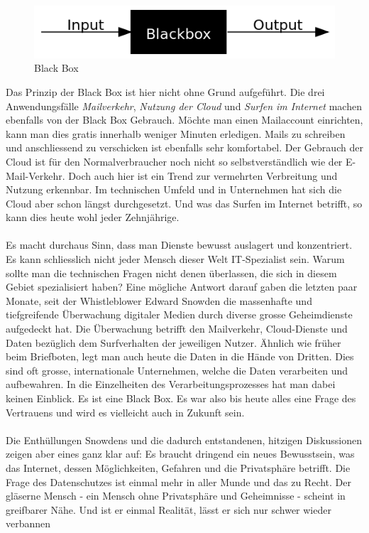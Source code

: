 \begin{figure}[h]
\centering
\includegraphics[scale=0.75]{images/BlackBox}
\caption{Black Box}
\end{figure}

Das Prinzip der Black Box ist hier nicht ohne Grund aufgeführt. Die drei Anwendungsfälle \textit{Mailverkehr}, \textit{Nutzung der Cloud} und \textit{Surfen im Internet} machen ebenfalls von der Black Box Gebrauch. Möchte man einen Mailaccount einrichten, kann man dies gratis innerhalb weniger Minuten erledigen. Mails zu schreiben und anschliessend zu verschicken ist ebenfalls sehr komfortabel. Der Gebrauch der Cloud ist für den Normalverbraucher noch nicht so selbstverständlich wie der E-Mail-Verkehr. Doch auch hier ist ein Trend zur vermehrten Verbreitung und Nutzung erkennbar. Im technischen Umfeld und in Unternehmen hat sich die Cloud aber schon längst durchgesetzt. Und was das Surfen im Internet betrifft, so kann dies heute wohl jeder Zehnjährige.
\\
\\
Es macht durchaus Sinn, dass man Dienste bewusst auslagert und konzentriert. Es kann schliesslich nicht jeder Mensch dieser Welt IT-Spezialist sein. Warum sollte man die technischen Fragen nicht denen überlassen, die sich in diesem Gebiet spezialisiert haben? Eine mögliche Antwort darauf gaben die letzten paar Monate, seit der Whistleblower Edward Snowden die massenhafte und tiefgreifende Überwachung digitaler Medien durch diverse grosse Geheimdienste aufgedeckt hat. Die Überwachung betrifft den Mailverkehr, Cloud-Dienste und Daten bezüglich dem Surfverhalten der jeweiligen Nutzer. Ähnlich wie früher beim Briefboten, legt man auch heute die Daten in die Hände von Dritten. Dies sind oft grosse, internationale Unternehmen, welche die Daten verarbeiten und aufbewahren. In die Einzelheiten des Verarbeitungsprozesses hat man dabei keinen Einblick. Es ist eine Black Box. Es war also bis heute alles eine Frage des Vertrauens und wird es vielleicht auch in Zukunft sein.
\\
\\
Die Enthüllungen Snowdens und die dadurch entstandenen, hitzigen Diskussionen zeigen aber eines ganz klar auf: Es braucht dringend ein neues Bewusstsein, was das Internet, dessen Möglichkeiten,  Gefahren und die Privatsphäre betrifft. Die Frage des Datenschutzes ist einmal mehr in aller Munde und das zu Recht. Der gläserne Mensch - ein Mensch ohne Privatsphäre und Geheimnisse - scheint in greifbarer Nähe. Und ist er einmal Realität, lässt er sich nur schwer wieder verbannen
